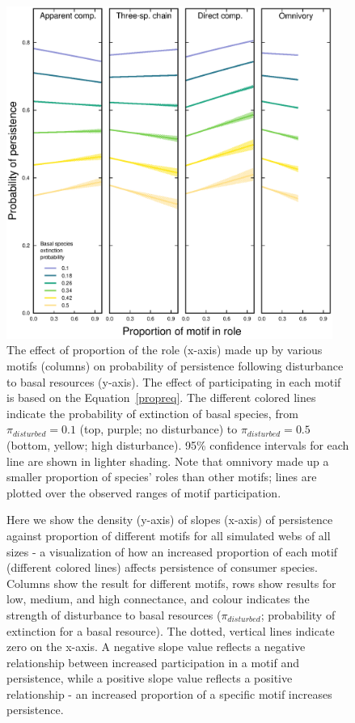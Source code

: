 \documentclass[12pt]{article}
\begin{document}
\begin{spacing}{2.0}
        \begin{figure}[hb!]
        \centering
        \includegraphics[width=0.95\textwidth]{figures/persistence_motif_participation.eps}
        \caption{The effect of proportion of the role (x-axis) made up by various motifs (columns) on probability of persistence following disturbance to basal resources (y-axis). The effect of participating in each motif is based on the Equation~\ref{propreq}. The different colored lines indicate the probability of extinction of basal species, from $\pi_{disturbed} = 0.1$ (top, purple; no disturbance) to $\pi_{disturbed} = 0.5$ (bottom, yellow; high disturbance). 95\% confidence intervals for each line are shown in lighter shading. Note that omnivory made up a smaller proportion of species' roles than other motifs; lines are plotted over the observed ranges of motif participation.}
    \label{fig:prop_lmer_all}
    \end{figure}
        
    \begin{figure}[hb!]
    \centering
        \caption{Here we show the density (y-axis) of slopes (x-axis) of persistence against proportion of different motifs for all simulated webs of all sizes - a visualization of how an increased proportion of each motif (different colored lines) affects persistence of consumer species. Columns show the result for different motifs, rows show results for low, medium, and high connectance, and colour indicates the strength of disturbance to basal resources ($\pi_{disturbed}$; probability of extinction for a basal resource). The dotted, vertical lines indicate zero on the x-axis. A negative slope value reflects a negative relationship between increased participation in a motif and persistence, while a positive slope value reflects a positive relationship - an increased proportion of a specific motif increases persistence.}
        \label{fig:density_prop}
    \end{figure}    



\end{spacing}
\end{document}
